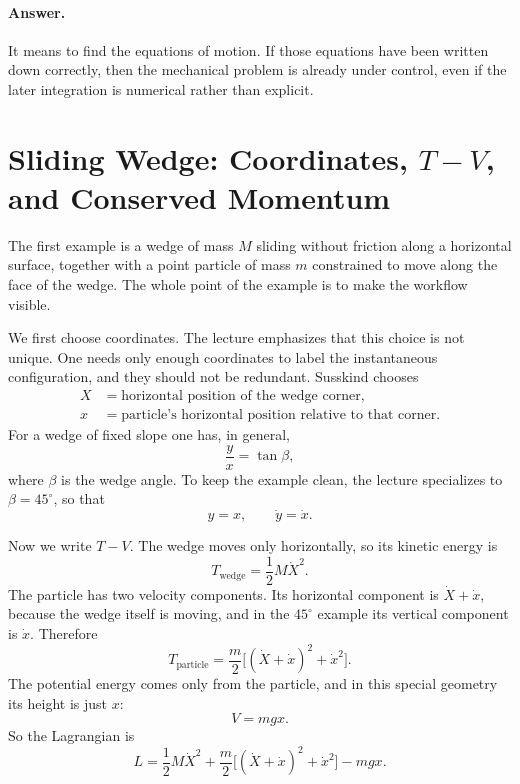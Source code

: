 \paragraph{Answer.} It means to find the equations of motion. If those equations have been written down correctly, then the mechanical problem is already under control, even if the later integration is numerical rather than explicit.

\section{Sliding Wedge: Coordinates, \(T-V\), and Conserved Momentum}

The first example is a wedge of mass \(M\) sliding without friction along a horizontal surface, together with a point particle of mass \(m\) constrained to move along the face of the wedge. The whole point of the example is to make the workflow visible.

We first choose coordinates. The lecture emphasizes that this choice is not unique. One needs only enough coordinates to label the instantaneous configuration, and they should not be redundant. Susskind chooses
\begin{equation}
\begin{aligned}
X&=\text{horizontal position of the wedge corner},\\
x&=\text{particle's horizontal position relative to that corner}.
\end{aligned}
\end{equation}
For a wedge of fixed slope one has, in general,
\begin{equation}
\frac{y}{x}=\tan\beta,
\end{equation}
where \(\beta\) is the wedge angle. To keep the example clean, the lecture specializes to \(\beta=45^\circ\), so that
\begin{equation}
y=x,\qquad \dot y=\dot x.
\end{equation}

Now we write \(T-V\). The wedge moves only horizontally, so its kinetic energy is
\begin{equation}
T_{\text{wedge}}=\frac12 M\dot X^2.
\end{equation}
The particle has two velocity components. Its horizontal component is \(\dot X+\dot x\), because the wedge itself is moving, and in the \(45^\circ\) example its vertical component is \(\dot x\). Therefore
\begin{equation}
T_{\text{particle}}=\frac m2\Big[(\dot X+\dot x)^2+\dot x^2\Big].
\end{equation}
The potential energy comes only from the particle, and in this special geometry its height is just \(x\):
\begin{equation}
V=mgx.
\end{equation}
So the Lagrangian is
\begin{equation}
L=\frac12 M\dot X^2+\frac m2\Big[(\dot X+\dot x)^2+\dot x^2\Big]-mgx.
\end{equation}

